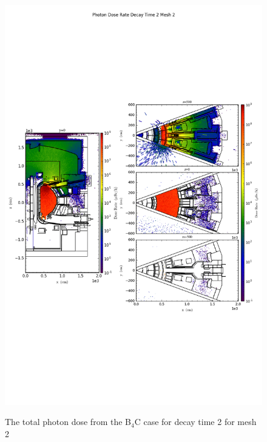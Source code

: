 \begin{figure}[ht!]
\centering
\includegraphics[trim={0cm 9cm 0cm 10cm},clip,scale=0.75]{../plots/final_model_with_b4c/Photon_Dose_Rate_Decay_Time_2_Mesh_2.png}
\label{fig:photons_dc2_no4bc_m2_flux}
\caption{The total photon dose from the B$_4$C case for decay time 2 for mesh 2}
\end{figure}

